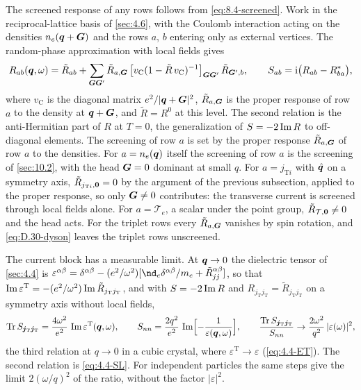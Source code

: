The screened response of any rows follows from \cref{eq:8.4-screened}. Work in the reciprocal-lattice basis of \cref{sec:4.6}, with the Coulomb interaction acting on the densities $n_e(\bm{q} + \bm{G})$ and the rows $a$, $b$ entering only as external vertices. The random-phase approximation with local fields gives
\begin{equation}
  R_{ab}(\bm{q},\omega) = \tilde R_{ab} + \sum_{\bm{G}\bm{G}'}\tilde R_{a,\bm{G}}\,\bigl[v_{\mathrm{C}}(1 - \tilde R\,v_{\mathrm{C}})^{-1}\bigr]_{\bm{G}\bm{G}'}\,\tilde R_{\bm{G}',b} , \qquad
  S_{ab} = \mathrm{i}\bigl(R_{ab} - R_{ba}^*\bigr) ,
  \label{eq:D.30-dyson}
\end{equation}
where $v_{\mathrm{C}}$ is the diagonal matrix $e^2/|\bm{q} + \bm{G}|^2$, $\tilde R_{a,\bm{G}}$ is the proper response of row $a$ to the density at $\bm{q} + \bm{G}$, and $\tilde R = R^0$ at this level. The second relation is the anti-Hermitian part of $R$ at $T = 0$, the generalization of $S = -2\operatorname{Im} R$ to off-diagonal elements. The screening of row $a$ is set by the proper response $\tilde R_{a,\bm{G}}$ of row $a$ to the densities. For $a = n_e(\bm{q})$ itself the screening of row $a$ is the screening of \cref{sec:10.2}, with the head $\bm{G} = 0$ dominant at small $q$. For $a = j_{\mathrm{T}i}$ with $\hat{\bm{q}}$ on a symmetry axis, $\tilde R_{j_{\mathrm{T}i},\bm{0}} = 0$ by the argument of the previous subsection, applied to the proper response, so only $\bm{G} \neq 0$ contributes: the transverse current is screened through local fields alone. For $a = \mathcal{T}_e$, a scalar under the point group, $\tilde R_{\mathcal{T},\bm{0}} \neq 0$ and the head acts. For the triplet rows every $\tilde R_{a,\bm{G}}$ vanishes by spin rotation, and \cref{eq:D.30-dyson} leaves the triplet rows unscreened.

The current block has a measurable limit. At $\bm{q} \to 0$ the dielectric tensor of \cref{sec:4.4} is $\varepsilon^{\alpha\beta} = \delta^{\alpha\beta} - (e^2/\omega^2)[\nd_e\delta^{\alpha\beta}/m_e + \tilde R^{\alpha\beta}_{jj}]$, so that $\operatorname{Im}\varepsilon^{\mathrm{T}} = -(e^2/\omega^2)\operatorname{Im}\tilde R_{j_{\mathrm{T}}j_{\mathrm{T}}}$, and with $S = -2\operatorname{Im} R$ and $R_{j_{\mathrm{T}}j_{\mathrm{T}}} = \tilde R_{j_{\mathrm{T}}j_{\mathrm{T}}}$ on a symmetry axis without local fields,
\begin{equation}
  \operatorname{Tr} S_{\bm{j}_{\mathrm{T}}\bm{j}_{\mathrm{T}}} = \frac{4\omega^2}{e^2}\,\operatorname{Im}\varepsilon^{\mathrm{T}}(\bm{q},\omega) , \qquad
  S_{nn} = \frac{2q^2}{e^2}\,\operatorname{Im}\Bigl[-\frac{1}{\varepsilon(\bm{q},\omega)}\Bigr] , \qquad
  \frac{\operatorname{Tr} S_{\bm{j}_{\mathrm{T}}\bm{j}_{\mathrm{T}}}}{S_{nn}} \to \frac{2\omega^2}{q^2}\,|\varepsilon(\omega)|^2 ,
  \label{eq:D.30-optical}
\end{equation}
the third relation at $q \to 0$ in a cubic crystal, where $\varepsilon^{\mathrm{T}} \to \varepsilon$ (\cref{eq:4.4-ET}). The second relation is \cref{eq:4.4-SL}. For independent particles the same steps give the limit $2(\omega/q)^2$ of the ratio, without the factor $|\varepsilon|^2$.

